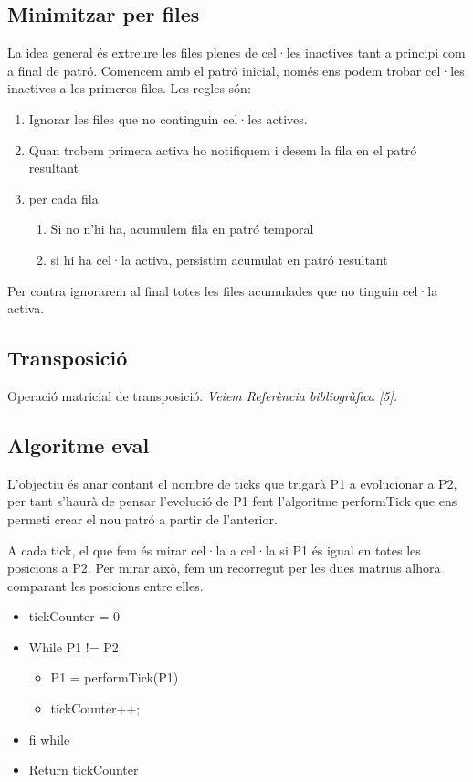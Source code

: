 \documentclass[12pt,a4paper]{report}
\begin{document}
\subsection{Minimitzar per files}

La idea general és extreure les files plenes de cel·les inactives tant a principi com a final de patró. Comencem amb el patró inicial, només ens podem trobar cel·les inactives a les primeres files. Les regles són:

\begin{enumerate}
\item Ignorar les files que no continguin cel·les actives.
\item Quan trobem primera activa ho notifiquem i desem la fila en el patró resultant
\item per cada fila
	\begin{enumerate}
		\item Si no n’hi ha, acumulem fila en patró temporal
		\item si hi ha cel·la activa, persistim acumulat en patró resultant
	\end{enumerate}
\end{enumerate}

Per contra ignorarem al final totes les files acumulades que no tinguin cel·la activa.

\subsection{Transposició}

Operació matricial de transposició. \textit{Veiem Referència bibliogràfica [5].}

\subsection{Algoritme eval}

L’objectiu és anar contant el nombre de ticks que trigarà P1 a evolucionar a P2, per tant s’haurà de pensar l’evolució de P1 fent l’algoritme performTick que ens permeti crear el nou patró a partir de l’anterior.

A cada tick, el que fem és mirar cel·la a cel·la si P1 és igual en totes les posicions a P2. Per mirar això, fem un recorregut per les dues matrius alhora comparant les posicions entre elles.

\begin{itemize}
\item tickCounter = 0
\item While P1 != P2
	\begin{itemize}
	\item P1 = performTick(P1)
	\item tickCounter++;
	\end{itemize}
\item fi while
\item Return tickCounter
\end{itemize}
\end{document}
